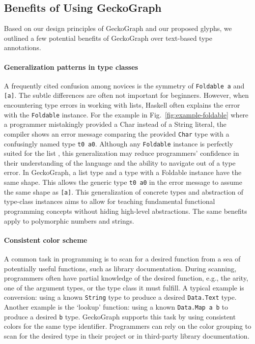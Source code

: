 \subsection{Benefits of Using GeckoGraph}\label{sec:benefits}
Based on our design principles of GeckoGraph and our proposed glyphs, we outlined a few potential benefits of GeckoGraph over text-based type annotations. 

\paragraph{Generalization patterns in type classes}
A frequently cited confusion among novices is the symmetry of \texttt{Foldable a} and \texttt{[a]}. The subtle differences are often not important for beginners. However, when encountering type errors in working with lists, Haskell often explains the error with the \texttt{Foldable} instance. For the example in Fig.~\ref{fig:example-foldable} where a programmer mistakingly provided a Char instead of a String literal, the compiler shows an error message comparing the provided \texttt{Char} type with a confusingly named type \texttt{t0 a0}. Although any \texttt{Foldable} instance is perfectly suited for the list \cite{Waldmann2018-hu}, this generalization may reduce programmers' confidence in their understanding of the language and the ability to navigate out of a type error. In GeckoGraph, a list type and a type with a Foldable instance have the same shape. This allows the generic type \texttt{t0 a0} in the error message to assume the same shape as \texttt{[a]}. This generalization of concrete types and abstraction of type-class instances aims to allow for teaching fundamental functional programming concepts without hiding high-level abstractions. The same benefits apply to polymorphic numbers and strings.


\paragraph{Consistent color scheme}\label{par:color-scheme}
A common task in programming is to scan for a desired function from a sea of potentially useful functions, such as library documentation. During scanning, programmers often have partial knowledge of the desired function, e.g., the arity, one of the argument types, or the type class it must fulfill.  A typical example is conversion: using a known \texttt{String} type to produce a desired \texttt{Data.Text}  type. Another example is the `lookup' function: using a known \texttt{Data.Map a b} to produce a desired \texttt{b} type. GeckoGraph supports this task by using consistent colors for the same type identifier. Programmers can rely on the color grouping to scan for the desired type in their project or in third-party library documentation.

